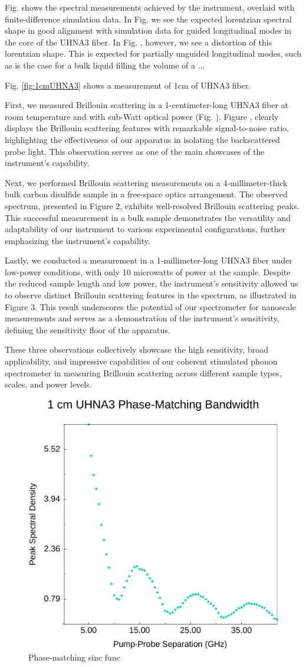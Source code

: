 \documentclass[%
  reprint,
  superscriptaddress,
  amsmath,amssymb,
  aps,
  prapplied,
]{revtex4-2}
\begin{document}
Fig. shows the spectral measurements achieved by the instrument, overlaid with finite-difference simulation data. In Fig. we see the expected lorentzian spectral shape in good alignment with simulation data for guided longitudinal modes in the core of the UHNA3 fiber. In Fig. , however, we see a distortion of this lorentzian shape. This is expected for partially unguided longitudinal modes, such as is the case for a bulk liquid filling the volume of a ...

Fig. \ref{fig:1cmUHNA3} shows a measurement of 1cm of UHNA3 fiber.

First, we measured Brillouin scattering in a 1-centimeter-long UHNA3 fiber at room temperature and with sub-Watt optical power (Fig. ). Figure , clearly displays the Brillouin scattering features with remarkable signal-to-noise ratio, highlighting the effectiveness of our apparatus in isolating the backscattered probe light. This observation serves as one of the main showcases of the instrument's capability.

Next, we performed Brillouin scattering measurements on a 4-millimeter-thick bulk carbon disulfide sample in a free-space optics arrangement. The observed spectrum, presented in Figure 2, exhibits well-resolved Brillouin scattering peaks. This successful measurement in a bulk sample demonstrates the versatility and adaptability of our instrument to various experimental configurations, further emphasizing the instrument's capability.

Lastly, we conducted a measurement in a 1-millimeter-long UHNA3 fiber under low-power conditions, with only 10 microwatts of power at the sample. Despite the reduced sample length and low power, the instrument's sensitivity allowed us to observe distinct Brillouin scattering features in the spectrum, as illustrated in Figure 3. This result underscores the potential of our spectrometer for nanoscale measurements and serves as a demonstration of the instrument's sensitivity, defining the sensitivity floor of the apparatus.

These three observations collectively showcase the high sensitivity, broad applicability, and impressive capabilities of our coherent stimulated phonon spectrometer in measuring Brillouin scattering across different sample types, scales, and power levels.

\begin{figure}[t]
\centering
\includegraphics[width=.45\textwidth]{Phase-Match.pdf}
\caption{Phase-matching sinc func}\label{fig:Phase-Match}
\end{figure}
\end{document}
